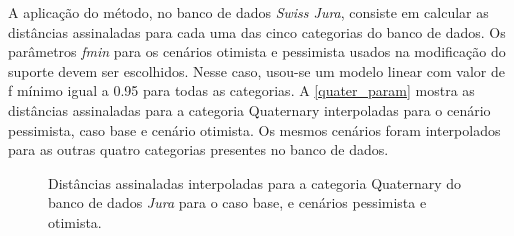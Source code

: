 A aplicação do método, no banco de dados \textit{Swiss Jura}, consiste em calcular as distâncias assinaladas para cada uma das cinco categorias do banco de dados. Os parâmetros \textit{fmin} para os cenários otimista e pessimista usados na modificação do suporte devem ser escolhidos. Nesse caso, usou-se um modelo linear com valor de f mínimo igual a 0.95 para todas as categorias. A \autoref{quater_param} mostra as distâncias assinaladas para a categoria Quaternary interpoladas para o cenário pessimista, caso base e cenário otimista. Os mesmos cenários foram interpolados para as outras quatro categorias presentes no banco de dados.

\begin{figure}[H]
    \centering
    \caption{Distâncias assinaladas interpoladas para a categoria Quaternary do banco de dados \textit{Jura} para o caso base, e cenários pessimista e otimista.} \label{quater_param}
     \hspace{1em}
     \hspace{1em}
\end{figure}

